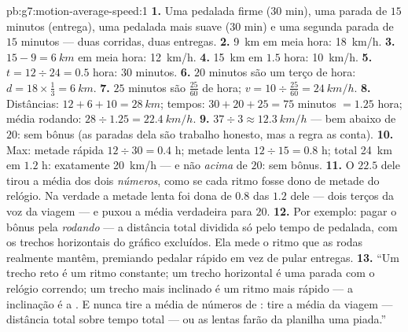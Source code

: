 \begin{solution}{pb:g7:motion-average-speed:1}
\textbf{1.} Uma pedalada firme ($30$ min), uma parada de $15$ minutos
(entrega), uma pedalada mais suave ($30$ min) e uma segunda parada de
$15$ minutos --- duas corridas, duas entregas.
\textbf{2.} \qty{9}{km} em meia hora: \qty{18}{km/h}.
\textbf{3.} $15 - 9 = \qty{6}{km}$ em meia hora: \qty{12}{km/h}.
\textbf{4.} \qty{15}{km} em $1.5$ hora: \qty{10}{km/h}.
\textbf{5.} $t = 12 \div 24 = 0.5$ hora: $30$ minutos.
\textbf{6.} $20$ minutos são um terço de hora:
$d = 18 \times \tfrac{1}{3} = \qty{6}{km}$.
\textbf{7.} $25$ minutos são $\tfrac{25}{60}$ de hora;
$v = 10 \div \tfrac{25}{60} = \qty{24}{km/h}$.
\textbf{8.} Distâncias: $12 + 6 + 10 = \qty{28}{km}$; tempos:
$30 + 20 + 25 = 75$ minutos $= 1.25$ hora; média rodando:
$28 \div 1.25 = \qty{22.4}{km/h}$.
\textbf{9.} $37 \div 3 \approx \qty{12.3}{km/h}$ --- bem abaixo de
$20$: sem bônus (as paradas dela são trabalho honesto, mas a regra as
conta).
\textbf{10.} Max: metade rápida $12 \div 30 = 0.4$ h; metade lenta
$12 \div 15 = 0.8$ h; total \qty{24}{km} em $1.2$ h: exatamente
\qty{20}{km/h} --- e não \emph{acima} de $20$: sem bônus.
\textbf{11.} O $22.5$ dele tirou a média dos dois \emph{números},
como se cada ritmo fosse dono de metade do relógio. Na verdade a
metade lenta foi dona de $0.8$ das $1.2$  dele --- dois terços
da voz da viagem --- e puxou a média verdadeira para $20$.
\textbf{12.} Por exemplo: pagar o bônus pela 
\emph{rodando} --- a distância total dividida só pelo tempo de
pedalada, com os trechos horizontais do gráfico excluídos. Ela mede o
ritmo que as rodas realmente mantêm, premiando pedalar rápido em vez
de pular entregas.
\textbf{13.} ``Um trecho reto é um ritmo constante; um trecho
horizontal é uma parada com o relógio correndo; um trecho mais
inclinado é um ritmo mais rápido --- a inclinação é a . E
nunca tire a média de números de : tire a média da viagem
--- distância total sobre tempo total --- ou as  lentas farão da
planilha uma piada.''
\end{solution}
